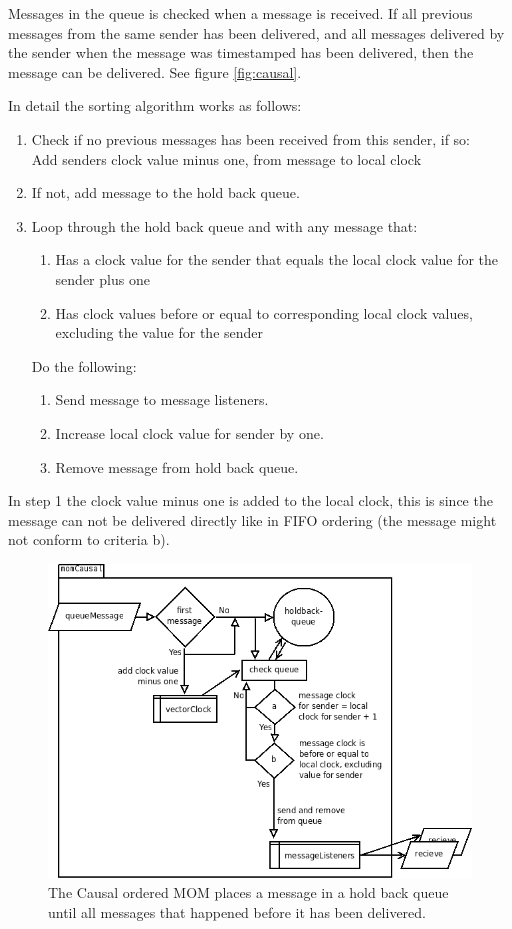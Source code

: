\documentclass[english]{article}
\begin{document}
Messages in the queue is checked when a message is received. If all previous messages from the same sender has been delivered, and all messages delivered by the sender when the message was timestamped has been delivered, then the message can be delivered. See figure \vref{fig:causal}.

In detail the sorting algorithm works as follows:
\begin{enumerate}
\item Check if no previous messages has been received from this sender, if so:\\
	Add senders clock value minus one, from message to local clock
\item If not, add message to the hold back queue.
\item Loop through the hold back queue and with any message that:
	\begin{enumerate}
	\item Has a clock value for the sender that equals the local clock value for the sender plus one
	\item Has clock values before or equal to corresponding local clock values, excluding the value for the sender
	\end{enumerate}
	Do the following:
	\begin{enumerate}
	\item Send message to message listeners.
	\item Increase local clock value for sender by one.
	\item Remove message from hold back queue.
	\end{enumerate}
\end{enumerate}

In step 1 the clock value minus one is added to the local clock, this is since the message can not be delivered directly like in FIFO ordering (the message might not conform to criteria b). 

\begin{figure}
\includegraphics[width=\textwidth]{momCausal.png}
\caption{The Causal ordered MOM places a message in a hold back queue until all messages that happened before it has been delivered.}
\label{fig:causal}
\end{figure}
\end{document}
